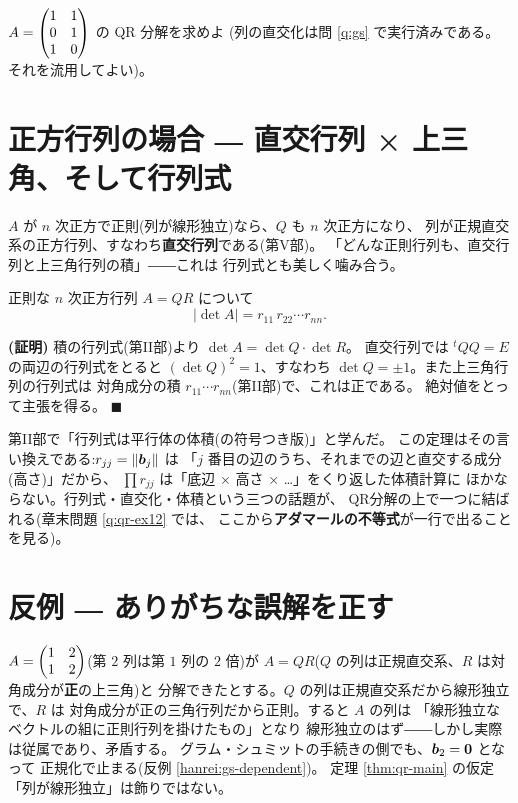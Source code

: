 \begin{mondai}\label{q:qr}
$A = \begin{pmatrix}1 & 1 \\ 0 & 1 \\ 1 & 0\end{pmatrix}$ の QR 分解を求めよ
(列の直交化は問 \ref{q:gs} で実行済みである。それを流用してよい)。
\end{mondai}

\section{正方行列の場合 ― 直交行列 × 上三角、そして行列式}

$A$ が $n$ 次正方で正則(列が線形独立)なら、$Q$ も $n$ 次正方になり、
列が正規直交系の正方行列、すなわち\textbf{直交行列}である(第V部)。
「どんな正則行列も、直交行列と上三角行列の積」――これは
行列式とも美しく噛み合う。

\begin{teiri}[QR分解と行列式]\label{thm:qr-det}
正則な $n$ 次正方行列 $A = QR$ について
\[
|\det A| = r_{11}\,r_{22} \cdots r_{nn}.
\]
\end{teiri}

\noindent\textbf{(証明)}\quad
積の行列式(第II部)より $\det A = \det Q \cdot \det R$。
直交行列では ${}^t\!QQ = E$ の両辺の行列式をとると
$(\det Q)^2 = 1$、すなわち $\det Q = \pm 1$。また上三角行列の行列式は
対角成分の積 $r_{11}\cdots r_{nn}$(第II部)で、これは正である。
絶対値をとって主張を得る。 $\blacksquare$

第II部で「行列式は平行体の体積(の符号つき版)」と学んだ。
この定理はその言い換えである:$r_{jj} = \|\bm{b}_j\|$ は
「$j$ 番目の辺のうち、それまでの辺と直交する成分(高さ)」だから、
$\prod r_{jj}$ は「底辺 × 高さ × …」をくり返した体積計算に
ほかならない。行列式・直交化・体積という三つの話題が、
QR分解の上で一つに結ばれる(章末問題 \ref{q:qr-ex12} では、
ここから\textbf{アダマールの不等式}が一行で出ることを見る)。

\section{反例 ― ありがちな誤解を正す}

\begin{hanrei}\label{hanrei:qr-dependent}
$A = \begin{pmatrix}1 & 2 \\ 1 & 2\end{pmatrix}$(第 $2$ 列は第 $1$ 列の $2$ 倍)が
$A = QR$($Q$ の列は正規直交系、$R$ は対角成分が\textbf{正}の上三角)と
分解できたとする。$Q$ の列は正規直交系だから線形独立で、$R$ は
対角成分が正の三角行列だから正則。すると $A$ の列は
「線形独立なベクトルの組に正則行列を掛けたもの」となり
線形独立のはず――しかし実際は従属であり、矛盾する。
グラム・シュミットの手続きの側でも、$\bm{b}_2 = \bm{0}$ となって
正規化で止まる(反例 \ref{hanrei:gs-dependent})。
定理 \ref{thm:qr-main} の仮定「列が線形独立」は飾りではない。
\end{hanrei}

